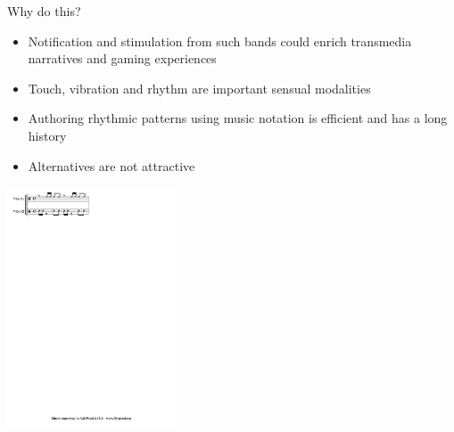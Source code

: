 \documentclass[handout]{beamer}
\begin{document}
\begin{frame}{Why do this?}
\begin{itemize}
\item Notification and stimulation from such bands could enrich transmedia narratives and gaming experiences
\item Touch, vibration and rhythm are important sensual modalities
\item Authoring rhythmic patterns using music notation is efficient and has a long history
\item Alternatives are not attractive
\end{itemize}
\bigskip
\centering
\includegraphics[width=5cm]{graphics/drums1-simple.pdf} 
\end{frame}
\end{document}
